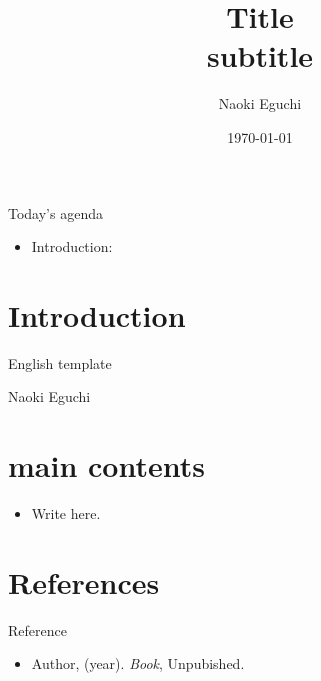 \documentclass[xcolor=dvipsnames,aspectratio=169]{beamer}
\begin{document}
 

\title{Title\\ \small{subtitle}}
\author{Naoki Eguchi}          
\date{\today}

\begin{frame}                  
    \titlepage                     
\end{frame}

\begin{frame}{Today's agenda}                  
    \begin{itemize}
        \item Introduction: 
    \end{itemize}
\end{frame}

\section{Introduction}

\begin{frame}{English template}
    \begin{definition}[name]
        Naoki Eguchi
    \end{definition}
\end{frame}

\section{main contents}

\begin{frame}
    \begin{itemize}
        \item Write here.
    \end{itemize}
\end{frame}

\section*{References}

\begin{frame}{Reference}
    \begin{itemize}
        \item Author, (year). 
        \textit{Book}, Unpubished.
    \end{itemize}
\end{frame}
\end{document}
